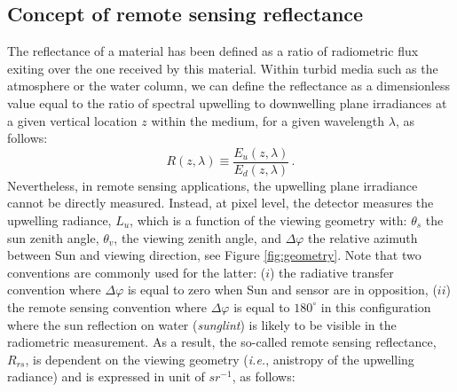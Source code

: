 \documentclass{article}
\begin{document}
\subsection{Concept of remote sensing reflectance}
The  reﬂectance of a material has been defined as a ratio of radiometric flux exiting over the one received by this material. Within turbid media such as the atmosphere or the water column, we can define the reflectance as a dimensionless value equal to the ratio of spectral upwelling to downwelling plane irradiances at a given vertical location $z$ within the medium, for a given wavelength $\lambda$, as follows: 
\begin{equation}
R(z, \lambda) \equiv \frac{E_u(z, \lambda)}{E_d(z, \lambda)} \, .
\label{eq:placeholder}
\end{equation}
Nevertheless, in remote sensing applications, the upwelling plane irradiance cannot be directly measured. Instead, at pixel level, the detector measures the upwelling radiance, $L_u$, which is a function of the viewing geometry with: $\theta_s$ the sun zenith angle, $\theta_v$, the viewing zenith angle, and $\Delta\varphi$ the relative azimuth between Sun and viewing direction, see Figure \ref{fig:geometry}. Note that two conventions are commonly used for the latter: ($i$)  the radiative transfer convention where $\Delta\varphi$ is equal to zero when Sun and sensor are in opposition, ($ii$) the remote sensing convention where $\Delta\varphi$ is equal to $180^\circ$ in this configuration where the sun reflection on water (\textit{sunglint}) is likely to be visible in the radiometric measurement. As a result, the so-called remote sensing reflectance, $R_{rs}$, is dependent on the viewing geometry (\textit{i.e.}, anistropy of the upwelling radiance) and is expressed in unit of $sr^{-1}$, as follows:
\end{document}
